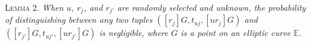 {{{%



\vspace{1mm}
\noindent\textsc{Lemma 2.} {\em When $u$, $r_j$, and $r_{j'}$ are randomly selected and unknown, the probability of distinguishing between any two tuples $([r_j]G, t_{uj}, [ur_j]G)$ and $([r_{j'}]G, t_{uj'}, [ur_{j'}]G)$ is negligible, where $G$ is a point on an elliptic curve $\mathbb{E}$.}

}}}
